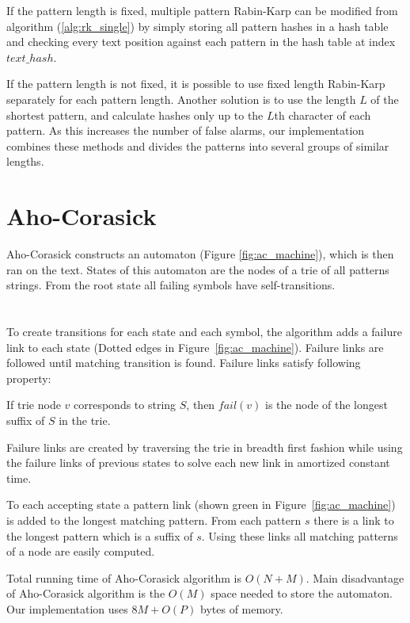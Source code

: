 \documentclass[final]{beamer}
\begin{document}
\begin{poster}
If the pattern length is fixed, multiple pattern Rabin-Karp can be modified from algorithm (\ref{alg:rk_single}) by simply storing all pattern hashes in a hash table and checking every text position against each pattern in the hash table at index $text\_hash$.

If the pattern length is not fixed, it is possible to use fixed length Rabin-Karp separately for each pattern length. Another solution is to use the length $L$ of the shortest pattern, and calculate hashes only up to the $L$th character of each pattern. As this increases the number of false alarms, our implementation combines these methods and divides the patterns into several groups of similar lengths.


\section{Aho-Corasick}

Aho-Corasick constructs an automaton (Figure \ref{fig:ac_machine}), which is then ran on the text.
States of this automaton are the nodes of a trie of all patterns strings.
From the root state all failing symbols have self-transitions.
\newcolumn
\section{}
\vspace{-19mm}
To create transitions for each state and each symbol, the algorithm adds a failure link to each state
(Dotted edges in Figure~\ref{fig:ac_machine}).
Failure links are followed until matching transition is found.
Failure links satisfy following property:

If trie node $v$ corresponds to string $S$, then
$fail(v)$ is the node of the longest suffix of $S$ in the trie.

Failure links are created by traversing the trie in breadth first fashion
while using the failure links of previous states to solve each new
link in amortized constant time.

To each accepting state a pattern link (shown green in Figure~\ref{fig:ac_machine})
is added to the longest matching pattern.
From each pattern $s$ there is a link to the longest pattern which
is a suffix of $s$.
Using these links all matching patterns of a node are easily
computed.

Total running time of Aho-Corasick algorithm is $O(N+M)$.
Main disadvantage of Aho-Corasick algorithm is the $O(M)$ space needed to store the automaton.
Our implementation uses $8M+O(P)$ bytes of memory.


\end{poster}
\end{document}
